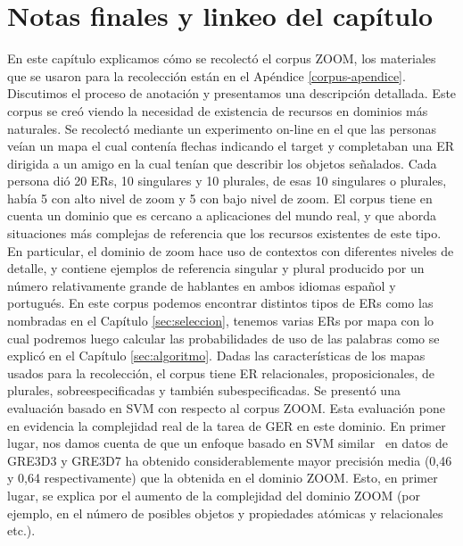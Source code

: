 \section{Notas finales y linkeo del cap\'itulo}
\label{sec-final}

En este cap\'itulo explicamos c\'omo se recolect\'o el corpus ZOOM, los materiales que se usaron para la recolecci\'on est\'an en el Ap\'endice \ref{corpus-apendice}. Discutimos el proceso de anotaci\'on y presentamos una descripci\'on detallada.
Este corpus se cre\'o viendo la necesidad de existencia de recursos en dominios m\'as naturales. Se recolect\'o mediante un experimento on-line en el que las personas ve\'ian un mapa el cual conten\'ia flechas indicando el target y completaban una ER dirigida a un amigo en la cual ten\'ian que describir los objetos se\~nalados. Cada persona di\'o 20 ERs, 10 singulares y 10 plurales, de esas 10 singulares o plurales, hab\'ia 5 con alto nivel de zoom y 5 con bajo nivel de zoom.
El corpus tiene en cuenta un dominio que es cercano a aplicaciones del mundo real, y que aborda situaciones m\'as complejas de referencia que los recursos existentes de este tipo. En particular, el dominio de zoom hace uso de contextos con diferentes niveles de detalle, y contiene ejemplos de referencia singular y plural producido por un n\'umero relativamente grande de hablantes en ambos idiomas espa\~nol y portugu\'es.
En este corpus podemos encontrar distintos tipos de ERs como las nombradas en el Cap\'itulo \ref{sec:seleccion}, tenemos varias ERs por mapa con lo cual podremos luego calcular las probabilidades de uso de las palabras como se explic\'o en el Cap\'itulo \ref{sec:algoritmo}. Dadas las caracter\'isticas de los mapas usados para la recolecci\'on, el corpus tiene ER relacionales, proposicionales, de plurales, sobreespecificadas y tambi\'en subespecificadas.
Se present\'o una evaluaci\'on basado en SVM con respecto al corpus ZOOM. Esta evaluaci\'on pone en evidencia la complejidad real de la tarea de GER en este dominio.
En primer lugar, nos damos cuenta de que un enfoque basado en SVM similar~\cite{thiago-svm} en datos de GRE3D3 y GRE3D7 ha obtenido considerablemente mayor precisi\'on media (0,46 y 0,64 respectivamente) que la obtenida en el dominio ZOOM. Esto, en primer lugar, se explica por el aumento de la complejidad del dominio ZOOM (por ejemplo, en el n\'umero de posibles objetos y propiedades at\'omicas y relacionales etc.). 
